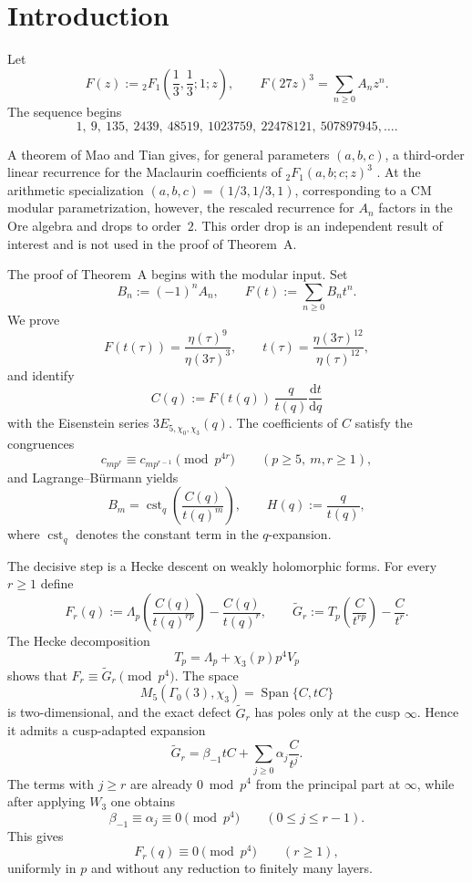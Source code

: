 \documentclass[11pt]{amsart}
\theoremstyle{remark}
\DeclareMathOperator{\Span}{Span}
\DeclareMathOperator{\cst}{cst}
\newcommand{\dd}{\mathrm{d}}
\begin{document}
\maketitle

\section{Introduction}

Let
\[
F(z):={}_2F_1\!\left(\frac13,\frac13;1;z\right),
\qquad
F(27z)^3=\sum_{n\ge0}A_n z^n.
\]
The sequence begins
\[
1,\ 9,\ 135,\ 2439,\ 48519,\ 1023759,\ 22478121,\ 507897945,\dots.
\]

A theorem of Mao and Tian gives, for general parameters $(a,b,c)$, a third-order linear recurrence for the
Maclaurin coefficients of ${}_2F_1(a,b;c;z)^3$ \cite{MT}. At the arithmetic specialization
$(a,b,c)=(1/3,1/3,1)$, corresponding to a CM modular parametrization, however, the rescaled recurrence for
$A_n$ factors in the Ore algebra and drops to order~$2$. This order drop is an independent result of
interest and is not used in the proof of Theorem~A.

The proof of Theorem~A begins with the modular input. Set
\[
B_n:=(-1)^nA_n,
\qquad
F(t):=\sum_{n\ge0}B_nt^n.
\]
We prove
\[
F(t(\tau))=\frac{\eta(\tau)^9}{\eta(3\tau)^3},
\qquad
t(\tau)=\frac{\eta(3\tau)^{12}}{\eta(\tau)^{12}},
\]
and identify
\[
C(q):=F(t(q))\,\frac{q}{t(q)}\frac{\dd t}{\dd q}
\]
with the Eisenstein series $3E_{5,\chi_0,\chi_3}(q)$. The coefficients of $C$ satisfy the congruences
\[
c_{mp^r}\equiv c_{mp^{r-1}}\pmod{p^{4r}}
\qquad (p\ge5,\ m,r\ge1),
\]
and Lagrange--B\"urmann yields
\[
B_m=\cst_q\!\left(\frac{C(q)}{t(q)^m}\right),
\qquad
H(q):=\frac{q}{t(q)},
\]
where $\cst_q$ denotes the constant term in the $q$-expansion.

The decisive step is a Hecke descent on weakly holomorphic forms. For every $r\ge1$ define
\[
F_r(q):=\Lambda_p\!\left(\frac{C(q)}{t(q)^{rp}}\right)-\frac{C(q)}{t(q)^r},
\qquad
\widetilde G_r:=T_p\!\left(\frac{C}{t^{rp}}\right)-\frac{C}{t^r}.
\]
The Hecke decomposition
\[
T_p=\Lambda_p+\chi_3(p)p^4V_p
\]
shows that $F_r\equiv \widetilde G_r\pmod{p^4}$. The space
\[
M_5(\Gamma_0(3),\chi_3)=\Span\{C,tC\}
\]
is two-dimensional, and the exact defect $\widetilde G_r$ has poles only at the cusp $\infty$. Hence it
admits a cusp-adapted expansion
\[
\widetilde G_r=\beta_{-1}tC+\sum_{j\ge0}\alpha_j\frac{C}{t^j}.
\]
The terms with $j\ge r$ are already $0\bmod p^4$ from the principal part at $\infty$, while after applying
$W_3$ one obtains
\[
\beta_{-1}\equiv \alpha_j\equiv0\pmod{p^4}
\qquad (0\le j\le r-1).
\]
This gives
\[
F_r(q)\equiv0\pmod{p^4}
\qquad (r\ge1),
\]
uniformly in $p$ and without any reduction to finitely many layers.
\end{document}
